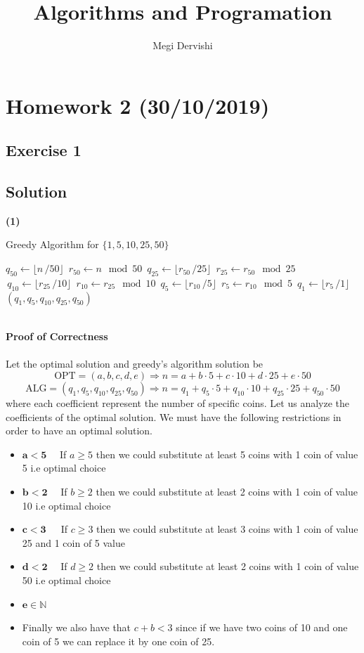 \documentclass[10pt,a4paper]{article}
\author{Megi Dervishi}
\title{Algorithms and Programation}
\begin{document}
\maketitle
\section*{Homework 2 (30/10/2019)}
\subsection*{Exercise 1}
\subsection*{Solution}
\textbf{(1)}
\begin{algorithm}
\caption{Greedy Algorithm for $\{1,5,10,25,50\}$}\label{ed}
\begin{algorithmic}[1]
	\State $\textit{q}_{50} \gets \lfloor n\, / 50 \rfloor$
	\State $\,  r_{50} \gets n \mod 50$
	\State $\,  q_{25} \gets \lfloor r_{50}\, / 25 \rfloor $
	\State $\, r_{25} \gets r_{50} \mod 25 \
	 $
	\State $\, q_{10} \gets \lfloor r_{25}\,  / 10\rfloor$
	\State $\, r_{10} \gets r_{25} \mod 10$
	\State $\, q_{5} \gets \lfloor r_{10}\,  / 5 \rfloor$
	\State $\, r_{5} \gets r_{10} \mod 5$
	\State $\, q_{1} \gets \lfloor r_{5}\, / 1 \rfloor$\\\Return $(q_1, q_5, q_{10}, q_{25}, q_{50})$
\EndFunction
\end{algorithmic}
\end{algorithm}
\\
\textbf{Proof of Correctness}\\\\
Let the optimal solution and greedy's algorithm solution be $$\text{OPT} = (a,b,c,d,e) \Rightarrow n = a + b\cdot 5 + c\cdot 10 + d\cdot 25 + e \cdot 50$$  $$\text{ALG} =(q_1, q_5, q_{10}, q_{25}, q_{50}) \Rightarrow  n = q_1 +  q_5\cdot 5 + q_{10}\cdot 10 + q_{25}\cdot 25 + q_{50}\cdot 50$$
where each coefficient represent the number of specific coins.
Let us analyze the coefficients of the optimal solution. We must have the following restrictions in order to have an optimal solution.
\begin{itemize}
\item $\mathbf{a < 5}\quad$       If $a \geq 5$ then we could substitute at least 5 coins with 1 coin of value 5 i.e optimal choice
\item $\mathbf{b < 2}\quad$      If $b \geq 2$ then we could substitute at least 2 coins with 1 coin of value 10 i.e optimal choice
\item $\mathbf{c < 3}\quad \,$        If $c \geq 3$ then we could substitute at least 3 coins with 1 coin of value 25 and 1 coin of 5 value
\item $\mathbf{d < 2}\quad$       If $d \geq 2$ then we could substitute at least 2 coins with 1 coin of value 50 i.e optimal choice
\item $\mathbf{e \in \mathbb{N}}\quad$
\item Finally we also have that $c + b < 3$ since if we have two coins of 10 and one coin of 5 we can replace it by one coin of 25.
\end{itemize}
\end{document}
